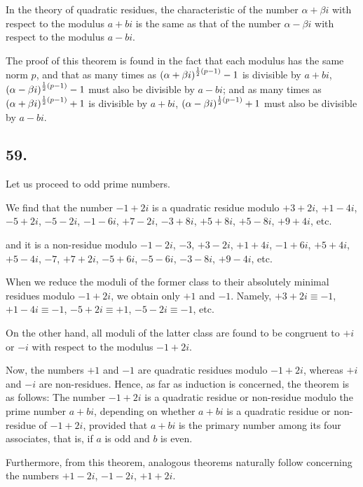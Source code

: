 \documentclass[twoside,12pt]{memoir}
\let\oldfrac\frac
\def\frac#1#2{\mathchoice{\tfrac{#1}{#2}}{\oldfrac{#1}{#2}}{\genfrac{}{}{}{2}{#1}{#2\mathstrut}}{\genfrac{}{}{}{3}{#1}{#2\mathstrut}}}
\begin{document}
In the theory of quadratic residues, the characteristic of the number \(\alpha+\beta i\) with respect to the modulus \(a+b i\) is the same as that of the number \(\alpha-\beta i\) with respect to the modulus \(a-b i\).

The proof of this theorem is found in the fact that each modulus has the same norm \(p\), and that as many times as \((\alpha+\beta i)^{\frac{1}{2}(p-1)}-1\) is divisible by \(a+b i\), \((\alpha-\beta i)^{\frac{1}{2}(p-1)}-1\) must also be divisible by \(a-b i\); and as many times as \((\alpha+\beta i)^{\frac{1}{2}(p-1)}+1\) is divisible by \(a+b i\), \((\alpha-\beta i)^{\frac{1}{2}(p-1)}+1\) must also be divisible by \(a-b i\).
%

\subsection*{59.}
Let us proceed to odd prime numbers.

We find that the number \(-1+2 i\) is a quadratic residue modulo \(+3+2 i\), \(+1-4 i\), \(-5+2 i\), \(-5-2 i\), \(-1-6 i\), \(+7-2 i\), \(-3+8 i\), \(+5+8 i\), \(+5-8 i\), \(+9+4 i\), etc{.}

and it is a non-residue modulo \(-1-2 i\), \(-3\), \(+3-2 i\), \(+1+4 i\), \(-1+6 i\), \(+5+4 i\), \(+5-4 i\), \(-7\), \(+7+2 i\), \(-5+6 i\), \(-5-6 i\), \(-3-8 i\), \(+9-4 i\), etc{.}

When we reduce the moduli of the former class to their absolutely minimal residues modulo \(-1+2 i\), we obtain only \(+1\) and \(-1\). Namely, \(+3+2 i \equiv -1\), \(+1-4 i \equiv -1\), \(-5+2 i \equiv +1\), \(-5-2 i \equiv -1\), etc{.}

On the other hand, all moduli of the latter class are found to be congruent to \(+i\) or \(-i\) with respect to the modulus \(-1+2 i\).

Now, the numbers \(+1\) and \(-1\) are quadratic residues modulo \(-1+2 i\), whereas \(+i\) and \(-i\) are non-residues. Hence, as far as induction is concerned, the theorem is as follows: The number \(-1+2 i\) is a quadratic residue or non-residue modulo the prime number \(a+b i\), depending on whether \(a+bi\) is a quadratic residue or non-residue of \(-1+2 i\), provided that \(a+b i\) is the primary number among its four associates, that is, if \(a\) is odd and \(b\) is even.

Furthermore, from this theorem, analogous theorems naturally follow concerning the numbers \(+1-2 i\), \(-1-2 i\), \(+1+2 i\).
%
\end{document}
